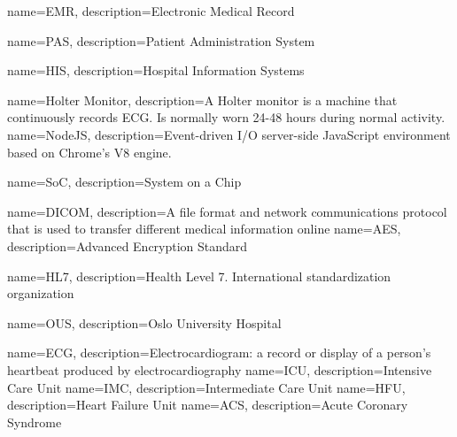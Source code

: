 {
    name=EMR,
    description={Electronic Medical Record}
}

{
    name=PAS,
    description={Patient Administration System}
}

{
    name=HIS,
    description={Hospital Information Systems}
}

{
    name=Holter Monitor,
    description={A Holter monitor is a machine that continuously records ECG. Is normally worn 24-48 hours during normal activity.}
}
{
    name=NodeJS,
    description={Event-driven I/O server-side JavaScript environment based on Chrome's V8 engine.}
}

{
    name=SoC,
    description={System on a Chip}
}

{
    name=DICOM,
    description={A file format and network communications protocol that is used to transfer different medical information online}
}
{
    name=AES,
    description={Advanced Encryption Standard}
}

{
    name=HL7,
    description={Health Level 7. International standardization organization}
}

{
    name=OUS,
    description={Oslo University Hospital}
}

{
    name=ECG,
    description={Electrocardiogram: a record or display of a person's heartbeat produced by electrocardiography}
}
{
    name=ICU,
    description={Intensive Care Unit}
}
{
    name=IMC,
    description={Intermediate Care Unit}
}
{
    name=HFU,
    description={Heart Failure Unit}
}
{
    name=ACS,
    description={Acute Coronary Syndrome}
}